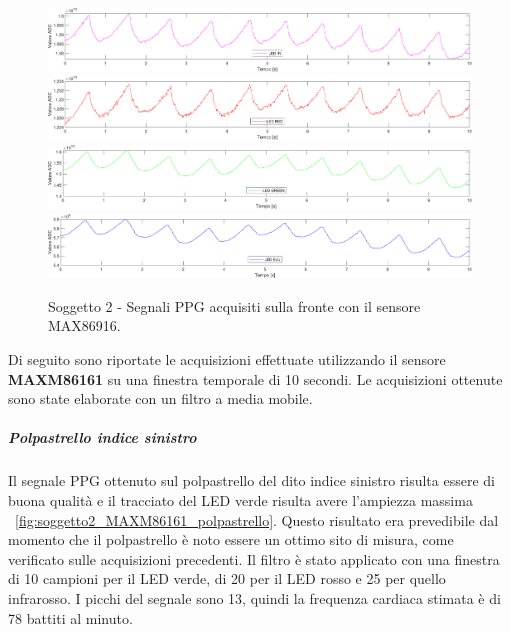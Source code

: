 \begin{figure}[h]
	\centering
	\includegraphics[width=1\linewidth]{ImageFiles/Misure Preliminari/Soggetto 2/max86916/fronte_ired}
	\includegraphics[width=1\linewidth]{ImageFiles/Misure Preliminari/Soggetto 2/max86916/fronte_red}
	\includegraphics[width=1\linewidth]{ImageFiles/Misure Preliminari/Soggetto 2/max86916/fronte_green}
	\includegraphics[width=1\linewidth]{ImageFiles/Misure Preliminari/Soggetto 2/max86916/fronte_blu}
	\caption{Soggetto 2 - Segnali PPG acquisiti sulla fronte con il sensore MAX86916.}
	\label{fig:soggetto2_MAX86916_fronte}
\end{figure}

\clearpage

Di seguito sono riportate le acquisizioni effettuate utilizzando il sensore \textbf{MAXM86161} su una finestra temporale di 10 secondi. Le acquisizioni ottenute sono state elaborate con un filtro a media mobile.

\subparagraph{Polpastrello indice sinistro}
Il segnale PPG ottenuto sul polpastrello del dito indice sinistro risulta essere di buona qualità e il tracciato del LED verde risulta avere l'ampiezza massima \Fig~\ref{fig:soggetto2_MAXM86161_polpastrello}. Questo risultato era prevedibile dal momento che il polpastrello è noto essere un ottimo sito di misura, come verificato sulle acquisizioni precedenti. Il filtro è stato applicato con una finestra di 10 campioni per il LED verde, di 20 per il LED rosso e 25 per quello infrarosso. I picchi del segnale sono 13, quindi la frequenza cardiaca stimata è di 78 battiti al minuto.

